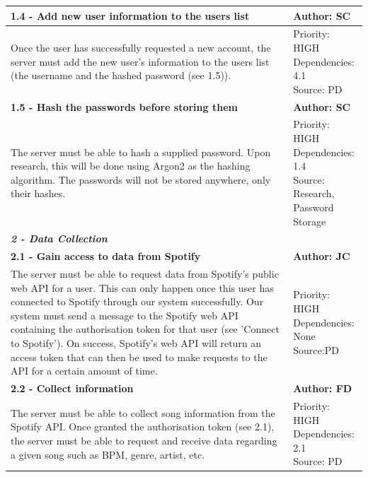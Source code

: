 \documentclass[10pt]{report}
\begin{document}
\begin{center}
\begin{longtable}{| p{13cm} | p{3cm} |}
\hline
\textbf{1.4 - Add new user information to the users list} & \textbf{Author: SC} \\
\hline
Once the user has successfully requested a new account, the server must add the new user’s information to the users list (the username and the hashed password (see 1.5)). &
\makecell{Priority: HIGH\\Dependencies: 4.1\\Source: PD}\\
\hline
\textbf{1.5 - Hash the passwords before storing them} & \textbf{Author: SC} \\
\hline
The server must be able to hash a supplied password. Upon research, this will be done using Argon2 as the hashing algorithm. The passwords will not be stored anywhere, only their hashes.&
\makecell{Priority: HIGH\\Dependencies: 1.4\\Source: Research,\\Password Storage}\\
\hline

\multicolumn{2}{|l|}{\textbf{\textit{2 - Data Collection}}} \\
\hline
\textbf{2.1 - Gain access to data from Spotify} & \textbf{Author: JC} \\
\hline
The server must be able to request data from Spotify’s public web API for a user. This can only happen once this user has connected to Spotify through our system successfully.
Our system must send a message to the Spotify web API containing the authorisation token for that user (see 'Connect to Spotify'). On success, Spotify's web API will return an access token that can then be used to make requests to the API for a certain amount of time.& 
\makecell{Priority: HIGH \\ Dependencies: None\\Source:PD} \\
\hline
\textbf{2.2 - Collect information} & \textbf{Author: FD} \\
\hline
The server must be able to collect song information from the Spotify API. Once granted the authorisation token (see 2.1), the server must be able to request and receive data regarding a given song such as BPM, genre, artist, etc.&
\makecell{Priority: HIGH\\Dependencies: 2.1\\Source: PD}\\
\hline


\end{longtable}
\end{center}
\end{document}
